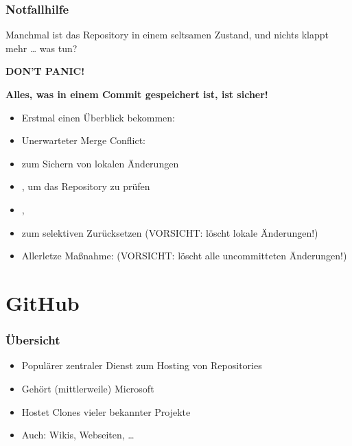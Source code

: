 \documentclass{cms-kurs}
\begin{document}
\begin{frame}
  \frametitle{Notfallhilfe}

  \onslide<+->

  Manchmal ist das Repository in einem seltsamen Zustand, und nichts klappt mehr
  … was tun?

  \onslide<+->

  \begin{center}
    \Large\textcolor{red!80!black}{\textbf{DON'T PANIC!}}
  \end{center}

  \smallskip{}

  \textbf{Alles, was in einem Commit gespeichert ist, ist sicher!}

  \medskip{}

  \begin{itemize}[<+->]
  \item Erstmal einen Überblick bekommen: 
  \item Unerwarteter Merge Conflict: 
  \item {} zum Sichern von lokalen Änderungen
  \item {}, um das Repository zu prüfen
  \item {}, 
  \item {} zum selektiven Zurücksetzen (VORSICHT:
    löscht lokale Änderungen!)
  \item Allerletze Maßnahme:  (VORSICHT: löscht
    alle uncommitteten Änderungen!)
  \end{itemize}

\end{frame}


\section{GitHub}

\begin{frame}
  \frametitle{Übersicht}

  \onslide<+->

  \begin{itemize}
  \item Populärer zentraler Dienst zum Hosting von Repositories
  \item Gehört (mittlerweile) Microsoft
  \item Hostet Clones vieler bekannter Projekte
  \item Auch: Wikis, Webseiten, …
  \end{itemize}

\end{frame}
\end{document}
